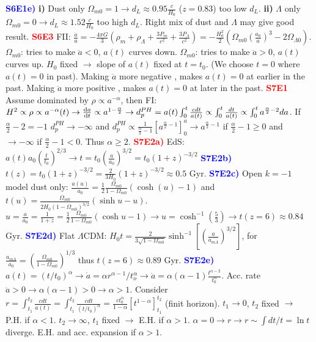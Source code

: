 \documentclass[landscape, a4paper,1pt,english]{article}
\begin{document}
{{{\begin{multicols}{5}
\textcolor{blue}{\textbf{S6E1e)}} \textbf{i)} Dust only $\Omega_{m0} = 1\rightarrow d_L \approx 0.95\frac{c}{H_0}$ ($z = 0.83$) too low $d_L$. \textbf{ii)} $\Lambda$ only $\Omega_{m0} = 0\rightarrow d_L \approx1.52\frac{c}{H_0}$ too high $d_L$. Right mix of dust and $\Lambda$ may give good result.
\textcolor{red}{\textbf{S6E3}} FII: $\frac{\ddot{a}}{a} = -\frac{4\pi G}{3}\left(\rho_m + \rho_\Lambda + \frac{3P_m}{c^2} + \frac{3P_\Lambda}{c^2}\right) = -\frac{H_0^2}{2}\left(\Omega_{m0}\left(\frac{a_0}{a}\right)^3 - 2\Omega_{\Lambda0}\right)$. $\Omega_{m0}$: tries to make $\ddot{a}<0$, $a(t)$ curves down. $\Omega_{m0}$: tries to make $\ddot{a}>0$, $a(t)$ curves up. $H_0$ fixed $\rightarrow$ slope of $a(t)$ fixed at $t=t_0$. (We choose $t=0$ where $a(t)=0$ in past). Making $\ddot{a}$ more negative , makes $a(t)=0$ at earlier in the past. Making $\ddot{a}$ more positive , makes $a(t)=0$ at later in the past.  
\textcolor{red}{\textbf{S7E1}} Assume dominated by $\rho\propto a^{-\alpha}$, then FI:
$H^2\propto\rho\propto a^{-\alpha}(t)\rightarrow \dv{a}{t}\propto a^{1-\frac{\alpha}{2}}\rightarrow d_p^{PH} = a(t)\int_{0}^{t}\frac{cdt}{a(t)}\propto\int_{0}^{t}\frac{dt}{a(t)} \propto \int_{0}^{t}a^{\frac{\alpha}{2} - 2}da$. If $\frac{\alpha}{2} - 2 = -1$ $d_p^{PH}\to-\infty$ and $d_p^{PH} \propto \frac{1}{\frac{\alpha}{2} - 1}\left[a^{\frac{\alpha}{2} - 1}\right]_0^a\to a^{\frac{\alpha}{2} - 1}$ if $\frac{\alpha}{2}-1\geq0$ and $\to-\infty$ if $\frac{\alpha}{2}-1<0$. Thus $\alpha \geq 2$.
\textcolor{red}{\textbf{S7E2a)}} EdS: $a(t)a_0(\frac{t}{t_0})^{2/3}\rightarrow t = t_0 (\frac{a}{a_0})^{3/2} = t_0(1+z)^{-3/2}$
\textcolor{blue}{\textbf{S7E2b)}} $t(z) = t_0(1+z)^{-3/2} = \frac{2}{3H_0}(1+z)^{-3/2}\approx0.5$ Gyr.
\textcolor{blue}{\textbf{S7E2c)}} Open $k=-1$ model dust only: $\frac{a(u)}{a_0} = \frac{1}{2}\frac{\Omega_{m0}}{1-\Omega_{m0}}(\cosh(u) - 1)$ and $t(u) = \frac{\Omega_{m0}}{2H_0(1-\Omega_{m0})^{3/2}}(\sinh u - u)$. $u = \frac{a}{a_0} = \frac{1}{1+z} = \frac{1}{2}\frac{\Omega_{m0}}{1-\Omega_{m0}}(\cosh u - 1)\rightarrow u = \cosh^{-1}\left(\frac{5}{3}\right)\rightarrow t(z = 6) \approx 0.84$Gyr.
\textcolor{blue}{\textbf{S7E2d)}} Flat $\Lambda$CDM: $H_0 t = \frac{2}{3\sqrt{1-\Omega_{m0}}}\sinh^{-1}\left[\left(\frac{a}{a_{m\Lambda}}\right)^{3/2}\right]$, for $\frac{a_{m\Lambda}}{a_0} = \left(\frac{\Omega_{m0}}{1-\Omega_{m0}}\right)^{1/3}$ thus $t(z = 6) \approx 0.89$ Gyr.
\textcolor{blue}{\textbf{S7E2e)}} $a(t) = (t/t_0)^\alpha\rightarrow\dot{a} = \alpha r^{\alpha - 1}/t_o^\alpha \rightarrow \ddot{a} = \alpha(\alpha - 1)\frac{t^{\alpha-2}}{t_0^\alpha}$. Acc. rate $\ddot{a}>0\rightarrow \alpha(\alpha - 1)>0\rightarrow\alpha>1$. Consider $r = \int_{t_1}^{t_2}\frac{cdt}{a(t)} = \int_{t_1}^{t_2}\frac{cdt}{(t/t_0)^\alpha} = \frac{ct_0^\alpha }{1-\alpha}[t^{1-\alpha}]_{t_1}^{t_2}$ (finit horizon). $t_1\to0$, $t_2$ fixed $\rightarrow$ P.H. if $\alpha<1$. $t_2\to\infty$, $t_1$ fixed $\rightarrow$ E.H. if $\alpha>1$. $\alpha = 0\rightarrow r\rightarrow r\sim\int dt/t = \ln t$ diverge. E.H. and acc. expansion if $\alpha >1$.

\end{multicols}}}}
\end{document}
